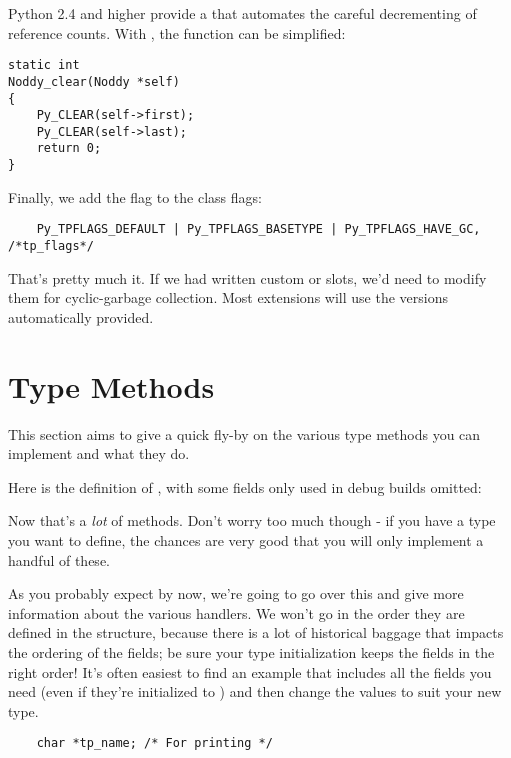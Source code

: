 Python 2.4 and higher provide a  that automates
the careful decrementing of reference counts.  With
, the  function can be
simplified:

\begin{verbatim}
static int
Noddy_clear(Noddy *self)
{
    Py_CLEAR(self->first);
    Py_CLEAR(self->last);
    return 0;
}
\end{verbatim}

Finally, we add the  flag to the class
flags:

\begin{verbatim}
    Py_TPFLAGS_DEFAULT | Py_TPFLAGS_BASETYPE | Py_TPFLAGS_HAVE_GC, /*tp_flags*/
\end{verbatim}

That's pretty much it.  If we had written custom  or
 slots, we'd need to modify them for cyclic-garbage
collection. Most extensions will use the versions automatically
provided.

\section{Type Methods
         \label{dnt-type-methods}}

This section aims to give a quick fly-by on the various type methods
you can implement and what they do.

Here is the definition of , with some fields only
used in debug builds omitted:



Now that's a \emph{lot} of methods.  Don't worry too much though - if
you have a type you want to define, the chances are very good that you
will only implement a handful of these.

As you probably expect by now, we're going to go over this and give
more information about the various handlers.  We won't go in the order
they are defined in the structure, because there is a lot of
historical baggage that impacts the ordering of the fields; be sure
your type initialization keeps the fields in the right order!  It's
often easiest to find an example that includes all the fields you need
(even if they're initialized to ) and then change the values
to suit your new type.

\begin{verbatim}
    char *tp_name; /* For printing */
\end{verbatim}

